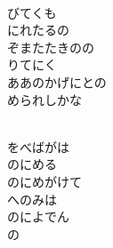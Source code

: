 \documentclass[10pt,b5j]{tarticle} %
\begin{document}
\begin{enumerate}
\begin{minipage}[c]{\blocksize}
    \end{minipage}
    \begin{minipage}[c]{\blocksize}
        
        \vspace{\linespace}
        \item~\\
        びてくも\\
        にれたるの\\
        ぞまたたきのの\\
        りてにく\\
        ああのかげにとの\\
        められしかな
        
    \end{minipage}
    \begin{minipage}[c]{\blocksize}
        
        \vspace{\linespace}
        \item~\\
        をべばがは\\
        のにめる\\
        のにめがけて\\
        へのみは\\
        のによでん\\
        の
    
    \end{minipage}
\end{enumerate} %
\end{document}
